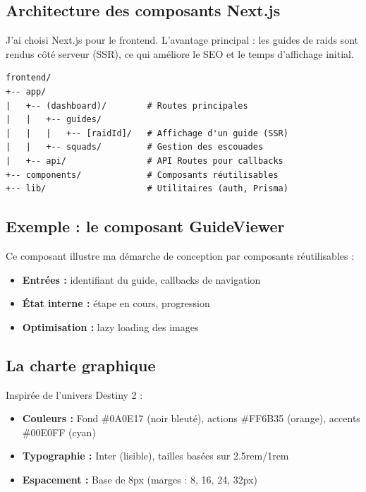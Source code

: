 \subsection{Architecture des composants Next.js}

J'ai choisi Next.js pour le frontend. L'avantage principal : les guides de raids sont rendus côté serveur (SSR), ce qui améliore le SEO et le temps d'affichage initial.

\begin{verbatim}
frontend/
+-- app/
|   +-- (dashboard)/        # Routes principales
|   |   +-- guides/
|   |   |   +-- [raidId]/   # Affichage d'un guide (SSR)
|   |   +-- squads/         # Gestion des escouades
|   +-- api/                # API Routes pour callbacks
+-- components/             # Composants réutilisables
+-- lib/                    # Utilitaires (auth, Prisma)
\end{verbatim}

\subsection{Exemple : le composant GuideViewer}

Ce composant illustre ma démarche de conception par composants réutilisables :
\begin{itemize}
    \item \textbf{Entrées :} identifiant du guide, callbacks de navigation
    \item \textbf{État interne :} étape en cours, progression
    \item \textbf{Optimisation :} lazy loading des images
\end{itemize}

\subsection{La charte graphique}

Inspirée de l'univers Destiny 2 :

\begin{itemize}
    \item \textbf{Couleurs :} Fond \#0A0E17 (noir bleuté), actions \#FF6B35 (orange), accents \#00E0FF (cyan)
    \item \textbf{Typographie :} Inter (lisible), tailles basées sur 2.5rem/1rem
    \item \textbf{Espacement :} Base de 8px (marges : 8, 16, 24, 32px)
\end{itemize}

